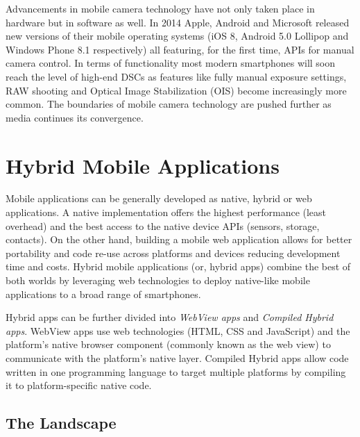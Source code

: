 \documentclass[thesis.tex]{subfiles}
\begin{document}
Advancements in mobile camera technology have not only taken place in hardware but in software as well. In 2014 Apple, Android and Microsoft released new versions of their mobile operating systems (iOS 8, Android 5.0 Lollipop and Windows Phone 8.1 respectively) all featuring, for the first time, APIs for manual camera control. In terms of functionality most modern smartphones will soon reach the level of high-end DSCs as features like fully manual exposure settings, RAW shooting and Optical Image Stabilization (OIS) become increasingly more common. The boundaries of mobile camera technology are pushed further as media continues its convergence.

\section{Hybrid Mobile Applications}
\label{section:hybrid_mobile_landscape}

Mobile applications can be generally developed as native, hybrid or web applications. A native implementation offers the highest performance (least overhead) and the best access to the native device APIs (sensors, storage, contacts). On the other hand, building a mobile web application allows for better portability and code re-use across platforms and devices reducing development time and costs. Hybrid mobile applications (or, hybrid apps) combine the best of both worlds by leveraging web technologies to deploy native-like mobile applications to a broad range of smartphones.

Hybrid apps can be further divided into \textit{WebView apps} and \textit{Compiled Hybrid apps}. WebView apps use web technologies (HTML, CSS and JavaScript) and the platform's native browser component (commonly known as the web view) to communicate with the platform's native layer. Compiled Hybrid apps allow code written in one programming language to target multiple platforms by compiling it to platform-specific native code.

\subsection{The Landscape}
\end{document}
